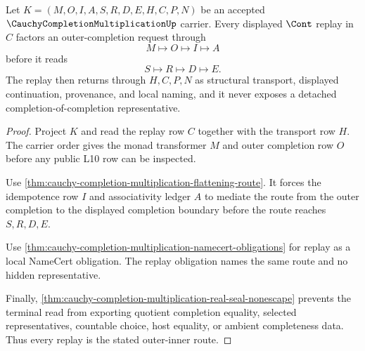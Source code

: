\begin{theorem}
\label{thm:cauchy-completion-multiplication-outer-inner-replay}
Let $K=(M,O,I,A,S,R,D,E,H,C,P,N)$ be an accepted $\CauchyCompletionMultiplicationUp$ carrier. Every displayed $\Cont$ replay in $C$ factors an outer-completion request through
$$
M \longmapsto O \longmapsto I \longmapsto A
$$
before it reads
$$
S \longmapsto R \longmapsto D \longmapsto E .
$$
The replay then returns through $H,C,P,N$ as structural transport, displayed continuation, provenance, and local naming, and it never exposes a detached completion-of-completion representative.
\end{theorem}
\begin{proof}
Project $K$ and read the replay row $C$ together with the transport row $H$. The carrier order gives the monad transformer $M$ and outer completion row $O$ before any public L10 row can be inspected.

Use \autoref{thm:cauchy-completion-multiplication-flattening-route}. It forces the idempotence row $I$ and associativity ledger $A$ to mediate the route from the outer completion to the displayed completion boundary before the route reaches $S,R,D,E$.

Use \autoref{thm:cauchy-completion-multiplication-namecert-obligations} for replay as a local NameCert obligation. The replay obligation names the same route and no hidden representative.

Finally, \autoref{thm:cauchy-completion-multiplication-real-seal-nonescape} prevents the terminal read from exporting quotient completion equality, selected representatives, countable choice, host equality, or ambient completeness data. Thus every replay is the stated outer-inner route.
\end{proof}

